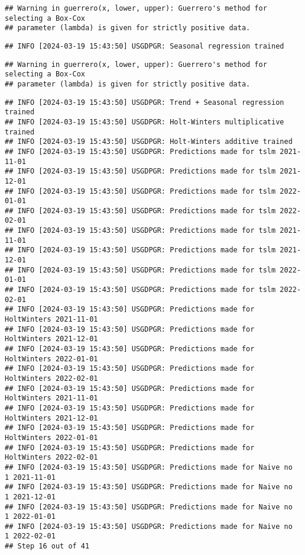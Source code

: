 \documentclass[
]{article}
\begin{document}
\begin{verbatim}
## Warning in guerrero(x, lower, upper): Guerrero's method for selecting a Box-Cox
## parameter (lambda) is given for strictly positive data.
\end{verbatim}

\begin{verbatim}
## INFO [2024-03-19 15:43:50] USGDPGR: Seasonal regression trained
\end{verbatim}

\begin{verbatim}
## Warning in guerrero(x, lower, upper): Guerrero's method for selecting a Box-Cox
## parameter (lambda) is given for strictly positive data.
\end{verbatim}

\begin{verbatim}
## INFO [2024-03-19 15:43:50] USGDPGR: Trend + Seasonal regression trained
## INFO [2024-03-19 15:43:50] USGDPGR: Holt-Winters multiplicative trained
## INFO [2024-03-19 15:43:50] USGDPGR: Holt-Winters additive trained
## INFO [2024-03-19 15:43:50] USGDPGR: Predictions made for tslm 2021-11-01
## INFO [2024-03-19 15:43:50] USGDPGR: Predictions made for tslm 2021-12-01
## INFO [2024-03-19 15:43:50] USGDPGR: Predictions made for tslm 2022-01-01
## INFO [2024-03-19 15:43:50] USGDPGR: Predictions made for tslm 2022-02-01
## INFO [2024-03-19 15:43:50] USGDPGR: Predictions made for tslm 2021-11-01
## INFO [2024-03-19 15:43:50] USGDPGR: Predictions made for tslm 2021-12-01
## INFO [2024-03-19 15:43:50] USGDPGR: Predictions made for tslm 2022-01-01
## INFO [2024-03-19 15:43:50] USGDPGR: Predictions made for tslm 2022-02-01
## INFO [2024-03-19 15:43:50] USGDPGR: Predictions made for HoltWinters 2021-11-01
## INFO [2024-03-19 15:43:50] USGDPGR: Predictions made for HoltWinters 2021-12-01
## INFO [2024-03-19 15:43:50] USGDPGR: Predictions made for HoltWinters 2022-01-01
## INFO [2024-03-19 15:43:50] USGDPGR: Predictions made for HoltWinters 2022-02-01
## INFO [2024-03-19 15:43:50] USGDPGR: Predictions made for HoltWinters 2021-11-01
## INFO [2024-03-19 15:43:50] USGDPGR: Predictions made for HoltWinters 2021-12-01
## INFO [2024-03-19 15:43:50] USGDPGR: Predictions made for HoltWinters 2022-01-01
## INFO [2024-03-19 15:43:50] USGDPGR: Predictions made for HoltWinters 2022-02-01
## INFO [2024-03-19 15:43:50] USGDPGR: Predictions made for Naive no  1 2021-11-01
## INFO [2024-03-19 15:43:50] USGDPGR: Predictions made for Naive no  1 2021-12-01
## INFO [2024-03-19 15:43:50] USGDPGR: Predictions made for Naive no  1 2022-01-01
## INFO [2024-03-19 15:43:50] USGDPGR: Predictions made for Naive no  1 2022-02-01
## Step 16 out of 41
\end{verbatim}
\end{document}
